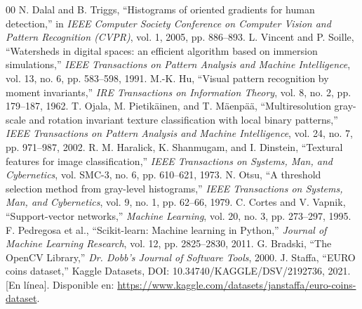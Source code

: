 \documentclass[journal,compsoc,twoside]{IEEEtran}
\begin{document}
\begin{thebibliography}{00}
 N. Dalal and B. Triggs, ``Histograms of oriented gradients for human detection,'' in \textit{IEEE Computer Society Conference on Computer Vision and Pattern Recognition (CVPR)}, vol. 1, 2005, pp. 886--893.
 L. Vincent and P. Soille, ``Watersheds in digital spaces: an efficient algorithm based on immersion simulations,'' \textit{IEEE Transactions on Pattern Analysis and Machine Intelligence}, vol. 13, no. 6, pp. 583--598, 1991.
 M.-K. Hu, ``Visual pattern recognition by moment invariants,'' \textit{IRE Transactions on Information Theory}, vol. 8, no. 2, pp. 179--187, 1962.
 T. Ojala, M. Pietik{\"a}inen, and T. M{\"a}enp{\"a}{\"a}, ``Multiresolution gray-scale and rotation invariant texture classification with local binary patterns,'' \textit{IEEE Transactions on Pattern Analysis and Machine Intelligence}, vol. 24, no. 7, pp. 971--987, 2002.
 R. M. Haralick, K. Shanmugam, and I. Dinstein, ``Textural features for image classification,'' \textit{IEEE Transactions on Systems, Man, and Cybernetics}, vol. SMC-3, no. 6, pp. 610--621, 1973.
 N. Otsu, ``A threshold selection method from gray-level histograms,'' \textit{IEEE Transactions on Systems, Man, and Cybernetics}, vol. 9, no. 1, pp. 62--66, 1979.
 C. Cortes and V. Vapnik, ``Support-vector networks,'' \textit{Machine Learning}, vol. 20, no. 3, pp. 273--297, 1995.
 F. Pedregosa et al., ``Scikit-learn: Machine learning in Python,'' \textit{Journal of Machine Learning Research}, vol. 12, pp. 2825--2830, 2011.
 G. Bradski, ``The OpenCV Library,'' \textit{Dr. Dobb's Journal of Software Tools}, 2000.
 J. Staffa, ``EURO coins dataset,'' Kaggle Datasets, DOI: 10.34740/KAGGLE/DSV/2192736, 2021. [En línea]. Disponible en: \url{https://www.kaggle.com/datasets/janstaffa/euro-coins-dataset}.
\end{thebibliography}
\end{document}
